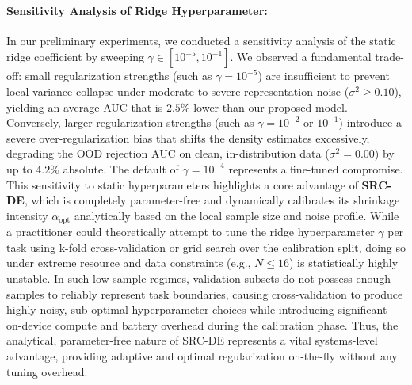\paragraph{Sensitivity Analysis of Ridge Hyperparameter:} In our preliminary experiments, we conducted a sensitivity analysis of the static ridge coefficient by sweeping $\gamma \in [10^{-5}, 10^{-1}]$. We observed a fundamental trade-off: small regularization strengths (such as $\gamma = 10^{-5}$) are insufficient to prevent local variance collapse under moderate-to-severe representation noise ($\sigma^2 \ge 0.10$), yielding an average AUC that is $2.5\%$ lower than our proposed model. Conversely, larger regularization strengths (such as $\gamma = 10^{-2}$ or $10^{-1}$) introduce a severe over-regularization bias that shifts the density estimates excessively, degrading the OOD rejection AUC on clean, in-distribution data ($\sigma^2 = 0.00$) by up to $4.2\%$ absolute. The default of $\gamma = 10^{-4}$ represents a fine-tuned compromise. This sensitivity to static hyperparameters highlights a core advantage of {\bf SRC-DE}, which is completely parameter-free and dynamically calibrates its shrinkage intensity $\alpha_{\text{opt}}$ analytically based on the local sample size and noise profile. While a practitioner could theoretically attempt to tune the ridge hyperparameter $\gamma$ per task using k-fold cross-validation or grid search over the calibration split, doing so under extreme resource and data constraints (e.g., $N \le 16$) is statistically highly unstable. In such low-sample regimes, validation subsets do not possess enough samples to reliably represent task boundaries, causing cross-validation to produce highly noisy, sub-optimal hyperparameter choices while introducing significant on-device compute and battery overhead during the calibration phase. Thus, the analytical, parameter-free nature of SRC-DE represents a vital systems-level advantage, providing adaptive and optimal regularization on-the-fly without any tuning overhead.

